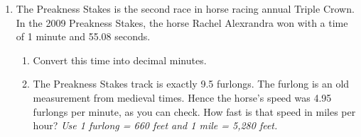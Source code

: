 \documentclass[12pt]{article}
\begin{document}
\begin{enumerate}
\item The Preakness Stakes is the second race in horse racing annual Triple Crown.  In the 2009 Preakness Stakes, the horse Rachel Alexrandra won with a time of 1 minute and 55.08 seconds.

\begin{enumerate}
\item Convert this time into decimal minutes.
\vfill
\vfill
\item The Preakness Stakes track is exactly 9.5 furlongs.  The furlong is an old measurement from medieval times.  Hence the horse's speed was 4.95 furlongs per minute, as you can check.  How fast is that speed in miles per hour?  \emph{Use 1 furlong = 660 feet and 1 mile = 5,280 feet.}
\vfill
\vfill
\vfill
\end{enumerate}

\end{enumerate}
\end{document}
